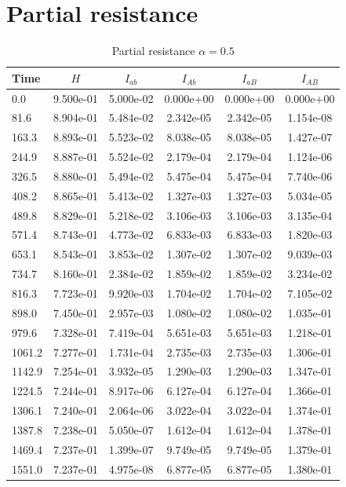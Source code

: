 \documentclass{report}
\begin{document}
\section{Partial resistance}
\begin{table}[htbp]
\centering
\caption{Partial resistance $\alpha=0.5$}
\label{tab:Partial_resistance}
\begin{tabular}{lccccc}
\toprule
Time & $H$ & $I_{ab}$ & $I_{Ab}$ & $I_{aB}$ & $I_{AB}$ \\
\midrule
0.0 & 9.500e-01 & 5.000e-02 & 0.000e+00 & 0.000e+00 & 0.000e+00 \\
81.6 & 8.904e-01 & 5.484e-02 & 2.342e-05 & 2.342e-05 & 1.154e-08 \\
163.3 & 8.893e-01 & 5.523e-02 & 8.038e-05 & 8.038e-05 & 1.427e-07 \\
244.9 & 8.887e-01 & 5.524e-02 & 2.179e-04 & 2.179e-04 & 1.124e-06 \\
326.5 & 8.880e-01 & 5.494e-02 & 5.475e-04 & 5.475e-04 & 7.740e-06 \\
408.2 & 8.865e-01 & 5.413e-02 & 1.327e-03 & 1.327e-03 & 5.034e-05 \\
489.8 & 8.829e-01 & 5.218e-02 & 3.106e-03 & 3.106e-03 & 3.135e-04 \\
571.4 & 8.743e-01 & 4.773e-02 & 6.833e-03 & 6.833e-03 & 1.820e-03 \\
653.1 & 8.543e-01 & 3.853e-02 & 1.307e-02 & 1.307e-02 & 9.039e-03 \\
734.7 & 8.160e-01 & 2.384e-02 & 1.859e-02 & 1.859e-02 & 3.234e-02 \\
816.3 & 7.723e-01 & 9.920e-03 & 1.704e-02 & 1.704e-02 & 7.105e-02 \\
898.0 & 7.450e-01 & 2.957e-03 & 1.080e-02 & 1.080e-02 & 1.035e-01 \\
979.6 & 7.328e-01 & 7.419e-04 & 5.651e-03 & 5.651e-03 & 1.218e-01 \\
1061.2 & 7.277e-01 & 1.731e-04 & 2.735e-03 & 2.735e-03 & 1.306e-01 \\
1142.9 & 7.254e-01 & 3.932e-05 & 1.290e-03 & 1.290e-03 & 1.347e-01 \\
1224.5 & 7.244e-01 & 8.917e-06 & 6.127e-04 & 6.127e-04 & 1.366e-01 \\
1306.1 & 7.240e-01 & 2.064e-06 & 3.022e-04 & 3.022e-04 & 1.374e-01 \\
1387.8 & 7.238e-01 & 5.050e-07 & 1.612e-04 & 1.612e-04 & 1.378e-01 \\
1469.4 & 7.237e-01 & 1.399e-07 & 9.749e-05 & 9.749e-05 & 1.379e-01 \\
1551.0 & 7.237e-01 & 4.975e-08 & 6.877e-05 & 6.877e-05 & 1.380e-01 \\

\end{tabular}
\end{table}
\end{document}
